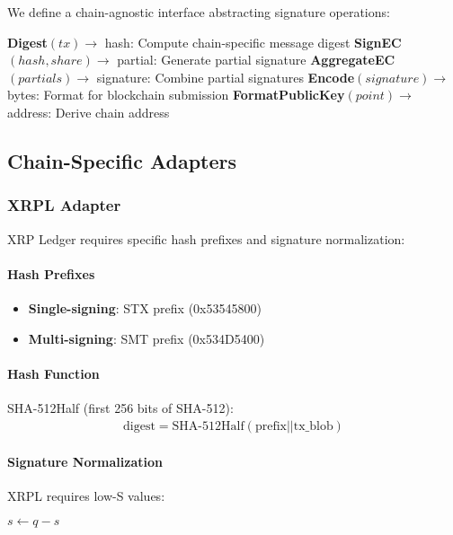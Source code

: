 \documentclass[11pt,twocolumn]{article}
\begin{document}
We define a chain-agnostic interface abstracting signature operations:

\begin{algorithmic}[1]
\State \textbf{Digest}$(tx) \to$ hash: Compute chain-specific message digest
\State \textbf{SignEC}$(hash, share) \to$ partial: Generate partial signature
\State \textbf{AggregateEC}$(partials) \to$ signature: Combine partial signatures
\State \textbf{Encode}$(signature) \to$ bytes: Format for blockchain submission
\State \textbf{FormatPublicKey}$(point) \to$ address: Derive chain address
\EndFunction
\end{algorithmic}

\subsection{Chain-Specific Adapters}

\subsubsection{XRPL Adapter}

XRP Ledger requires specific hash prefixes and signature normalization:

\paragraph{Hash Prefixes}
\begin{itemize}
\item \textbf{Single-signing}: STX prefix (0x53545800)
\item \textbf{Multi-signing}: SMT prefix (0x534D5400)
\end{itemize}

\paragraph{Hash Function} SHA-512Half (first 256 bits of SHA-512):
\begin{align*}
\text{digest} = \text{SHA-512Half}(\text{prefix} || \text{tx\_blob})
\end{align*}

\paragraph{Signature Normalization} XRPL requires low-S values:
\begin{algorithmic}[1]
    \State $s \leftarrow q - s$
\EndIf
\end{algorithmic}
\end{document}
